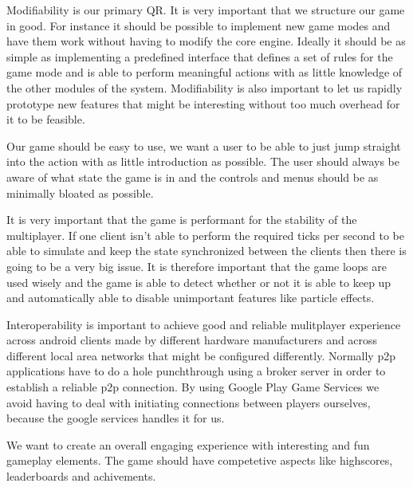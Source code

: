 
	Modifiability is our primary QR. It is very important that we structure our game in good. For instance it should be possible to implement new game modes and have them work without having to modify the core engine. Ideally it should be as simple as implementing a predefined interface that defines a set of rules for the game mode and is able to perform meaningful actions with as little knowledge of the other modules of the system. Modifiability is also important to let us rapidly prototype new features that might be interesting without too much overhead for it to be feasible.

	Our game should be easy to use, we want a user to be able to just jump straight into the action with as little introduction as possible. The user should always be aware of what state the game is in and the controls and menus should be as minimally bloated as possible.

	It is very important that the game is performant for the stability of the multiplayer. If one client isn't able to perform the required ticks per second to be able to simulate	and keep the state synchronized between the clients then there is going to be a very big issue. It is therefore important that the game loops are used wisely and the game is able to detect whether or not it is able to keep up and automatically able to disable unimportant features like particle effects.

	Interoperability is important to achieve good and reliable mulitplayer experience across android clients made by different hardware manufacturers and across different local area networks that might be configured differently. Normally p2p applications have to do a hole punchthrough using a broker server in order to establish a reliable p2p connection. By using Google Play Game Services we avoid having to deal with initiating connections between players ourselves, because the google services handles it for us.


	We want to create an overall engaging experience with interesting and fun gameplay elements. The game should have competetive aspects	like highscores, leaderboards and achivements.

